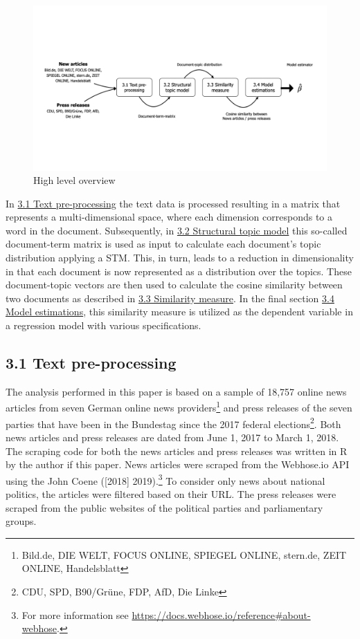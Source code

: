 \documentclass[
  12pt,
]{article}
\begin{document}
\begin{figure}
\centering
\includegraphics{../figs/high_level_overview.png}
\caption{High level overview}
\end{figure}

In \protect\hyperlink{text-pre-processing}{3.1 Text pre-processing} the
text data is processed resulting in a matrix that represents a
multi-dimensional space, where each dimension corresponds to a word in
the document. Subsequently, in
\protect\hyperlink{structural-topic-model}{3.2 Structural topic model}
this so-called document-term matrix is used as input to calculate each
document's topic distribution applying a STM. This, in turn, leads to a
reduction in dimensionality in that each document is now represented as
a distribution over the topics. These document-topic vectors are then
used to calculate the cosine similarity between two documents as
described in \protect\hyperlink{similarity-measure}{3.3 Similarity
measure}. In the final section
\protect\hyperlink{34-model-estimations}{3.4 Model estimations}, this
similarity measure is utilized as the dependent variable in a regression
model with various specifications.

\hypertarget{text-pre-processing}{%
\subsection{3.1 Text pre-processing}\label{text-pre-processing}}

The analysis performed in this paper is based on a sample of 18,757
online news articles from seven German online news providers\footnote{Bild.de,
  DIE WELT, FOCUS ONLINE, SPIEGEL ONLINE, stern.de, ZEIT ONLINE,
  Handelsblatt} and press releases of the seven parties that have been
in the Bundestag since the 2017 federal elections\footnote{CDU, SPD,
  B90/Grüne, FDP, AfD, Die Linke}. Both news articles and press releases
are dated from June 1, 2017 to March 1, 2018. The scraping code for both
the news articles and press releases was written in R by the author if
this paper. News articles were scraped from the Webhose.io API using the
John Coene ({[}2018{]} 2019).\footnote{For more information see
  \url{https://docs.webhose.io/reference\#about-webhose}.} To consider
only news about national politics, the articles were filtered based on
their URL. The press releases were scraped from the public websites of
the political parties and parliamentary groups.
\end{document}
